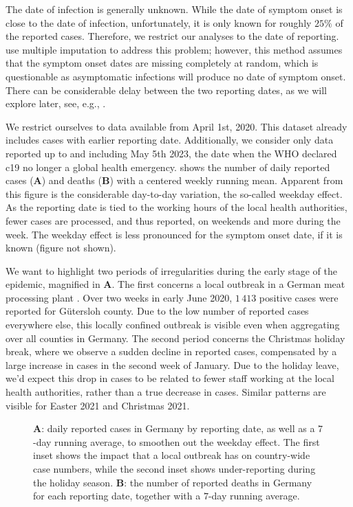 The date of infection is generally unknown. While the date of symptom onset is close to the date of infection, unfortunately, it is only known for roughly $25\%$ of the reported cases. Therefore, we restrict our analyses to the date of reporting. \citet{AnDerHeiden2020Schatzung} use multiple imputation to address this problem; however, this method assumes that the symptom onset dates are missing completely at random, which is questionable as asymptomatic infections will produce no date of symptom onset. There can be considerable delay between the two reporting dates, as we will explore later, see, e.g., .

We restrict ourselves to data available from April 1st, 2020. This dataset already includes cases with earlier reporting date. Additionally, we consider only data reported up to and including May 5th 2023, the date when the WHO declared \acrshort{c19} no longer a global health emergency.  shows the number of daily reported cases (\textbf{A}) and deaths (\textbf{B}) with a centered weekly running mean. Apparent from this figure is the considerable day-to-day variation, the so-called weekday effect. As the reporting date is tied to the working hours of the local health authorities, fewer cases are processed, and thus reported, on weekends and more during the week. The weekday effect is less pronounced for the symptom onset date, if it is known (figure not shown). 

We want to highlight two periods of irregularities during the early stage of the epidemic, magnified in  \textbf{A}. The first concerns a local outbreak in a German meat processing plant \citep{Gunther2020SARSCoV2}. Over two weeks in early June 2020, $1\,413$ positive cases were reported for Gütersloh county. Due to the low number of reported cases everywhere else, this locally confined outbreak is visible even when aggregating over all counties in Germany. 
The second period concerns the Christmas holiday break, where we observe a sudden decline in reported cases, compensated by a large increase in cases in the second week of January. Due to the holiday leave, we'd expect this drop in cases to be related to fewer staff working at the local health authorities, rather than a true decrease in cases. Similar patterns are visible for Easter 2021 and Christmas 2021. 

\begin{figure}
    \resizebox{\textwidth}{!}{%
    }
    \caption{\textbf{A}: daily reported cases in Germany by reporting date, as well as a $7$-day running average, to smoothen out the weekday effect. The first inset shows the impact that a local outbreak \citep{Gunther2020SARSCoV2} has on country-wide case numbers, while the second inset shows under-reporting during the holiday season.  \textbf{B}: the number of reported deaths in Germany for each reporting date, together with a $7$-day running average.}
    \label{fig:cases_germany}
\end{figure}



